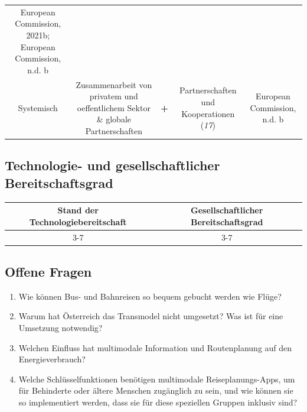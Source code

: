 \documentclass[
]{book}
\providecommand{\tightlist}{%
  \setlength{\itemsep}{0pt}\setlength{\parskip}{0pt}}
\begin{document}
\begin{longtable}[]{@{}ccccc@{}}
\begin{minipage}[t]{0.17\columnwidth}
European Commission, 2021b; European Commission, n.d. b\strut
\end{minipage}\tabularnewline
\begin{minipage}[t]{0.17\columnwidth}\centering
Systemisch\strut
\end{minipage} & \begin{minipage}[t]{0.16\columnwidth}\centering
Zusammenarbeit von privatem und oeffentlichem Sektor \& globale Partnerschaften\strut
\end{minipage} & \begin{minipage}[t]{0.17\columnwidth}\centering
\textbf{+}\strut
\end{minipage} & \begin{minipage}[t]{0.17\columnwidth}\centering
Partnerschaften und Kooperationen (\emph{17})\strut
\end{minipage} & \begin{minipage}[t]{0.17\columnwidth}\centering
European Commission, n.d. b\strut
\end{minipage}\tabularnewline
\bottomrule
\end{longtable}

\hypertarget{technologie--und-gesellschaftlicher-bereitschaftsgrad-18}{%
\subsection*{Technologie- und gesellschaftlicher Bereitschaftsgrad}\label{technologie--und-gesellschaftlicher-bereitschaftsgrad-18}}

\begin{longtable}[]{@{}cc@{}}
\toprule
Stand der Technologiebereitschaft & Gesellschaftlicher Bereitschaftsgrad\tabularnewline
\midrule
\endhead
3-7 & 3-7\tabularnewline
\bottomrule
\end{longtable}

\hypertarget{offene-fragen-21}{%
\subsection*{Offene Fragen}\label{offene-fragen-21}}

\begin{enumerate}
\def\labelenumi{\arabic{enumi}.}
\tightlist
\item
  Wie können Bus- und Bahnreisen so bequem gebucht werden wie Flüge?
\item
  Warum hat Österreich das Transmodel nicht umgesetzt? Was ist für eine Umsetzung notwendig?
\item
  Welchen Einfluss hat multimodale Information und Routenplanung auf den Energieverbrauch?
\item
  Welche Schlüsselfunktionen benötigen multimodale Reiseplanungs-Apps, um für Behinderte oder ältere Menschen zugänglich zu sein, und wie können sie so implementiert werden, dass sie für diese speziellen Gruppen inklusiv sind?
\end{enumerate}
\end{document}
